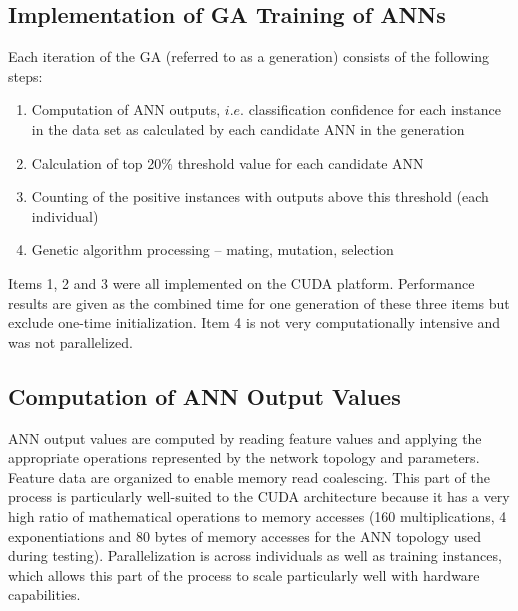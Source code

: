 \documentclass[11pt]{article}       %
\begin{document}
\subsection{Implementation of GA Training of ANNs} \label{implementation}
Each iteration of the GA (referred to as a generation) consists of the following steps:
\begin{enumerate}
	\item Computation of ANN outputs, $i.e.$ classification confidence for each instance in the data set as calculated by each candidate ANN in the generation
	\item Calculation of top 20\% threshold value for each candidate ANN
	\item Counting of the positive instances with outputs above this threshold (each individual)
	\item Genetic algorithm processing -- mating, mutation, selection
\end{enumerate}

Items 1, 2 and 3 were all implemented on the CUDA platform. Performance results are given as the combined time for one generation of these three items but exclude one-time initialization. Item 4 is not very computationally intensive and was not parallelized. 

\subsection{Computation of ANN Output Values} \label{implementation}
ANN output values are computed by reading feature values and applying the appropriate operations represented by the network topology and parameters. Feature data are organized to enable memory read coalescing. This part of the process is particularly well-suited to the CUDA architecture because it has a very high ratio of mathematical operations to memory accesses (160 multiplications, 4 exponentiations and 80 bytes of memory accesses for the ANN topology used during testing). Parallelization is across individuals as well as training instances, which allows this part of the process to scale particularly well with hardware capabilities.

\end{document}
